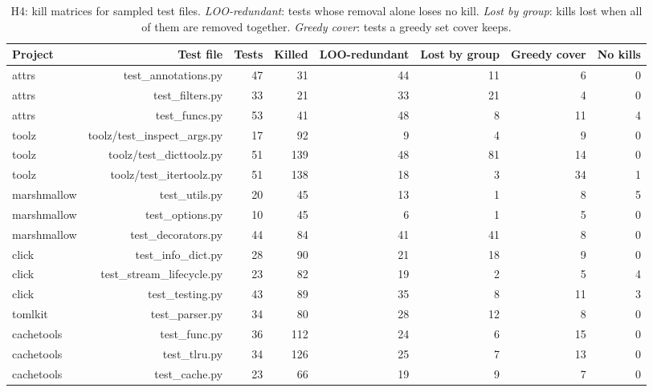 \begin{table}[t]
\centering\small
\begin{tabular}{lrrrrrrr}
\toprule
Project & Test file & Tests & Killed & LOO-redundant & Lost by group & Greedy cover & No kills \\
\midrule
attrs & test\_annotations.py & 47 & 31 & 44 & 11 & 6 & 0 \\
attrs & test\_filters.py & 33 & 21 & 33 & 21 & 4 & 0 \\
attrs & test\_funcs.py & 53 & 41 & 48 & 8 & 11 & 4 \\
toolz & toolz/test\_inspect\_args.py & 17 & 92 & 9 & 4 & 9 & 0 \\
toolz & toolz/test\_dicttoolz.py & 51 & 139 & 48 & 81 & 14 & 0 \\
toolz & toolz/test\_itertoolz.py & 51 & 138 & 18 & 3 & 34 & 1 \\
marshmallow & test\_utils.py & 20 & 45 & 13 & 1 & 8 & 5 \\
marshmallow & test\_options.py & 10 & 45 & 6 & 1 & 5 & 0 \\
marshmallow & test\_decorators.py & 44 & 84 & 41 & 41 & 8 & 0 \\
click & test\_info\_dict.py & 28 & 90 & 21 & 18 & 9 & 0 \\
click & test\_stream\_lifecycle.py & 23 & 82 & 19 & 2 & 5 & 4 \\
click & test\_testing.py & 43 & 89 & 35 & 8 & 11 & 3 \\
tomlkit & test\_parser.py & 34 & 80 & 28 & 12 & 8 & 0 \\
cachetools & test\_func.py & 36 & 112 & 24 & 6 & 15 & 0 \\
cachetools & test\_tlru.py & 34 & 126 & 25 & 7 & 13 & 0 \\
cachetools & test\_cache.py & 23 & 66 & 19 & 9 & 7 & 0 \\
\bottomrule
\end{tabular}
\caption{H4: kill matrices for sampled test files. \emph{LOO-redundant}: tests whose removal alone loses no kill. \emph{Lost by group}: kills lost when all of them are removed together. \emph{Greedy cover}: tests a greedy set cover keeps.}
\label{tab:h4}
\end{table}
